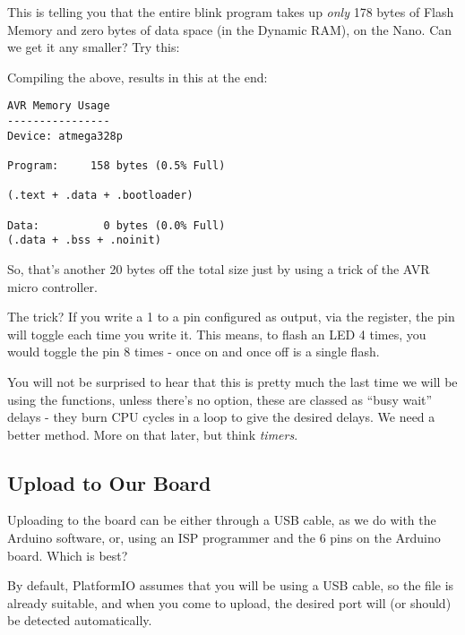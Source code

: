 This is telling you that the entire blink program takes up \emph{only}
178 bytes of Flash Memory and zero bytes of data space (in the Dynamic
RAM), on the Nano.  Can we get it any smaller? Try this:




Compiling the above, results in this at the end:

\begin{lstlisting}[firstnumber=14]
AVR Memory Usage
----------------
Device: atmega328p

Program:     158 bytes (0.5% Full)

(.text + .data + .bootloader)

Data:          0 bytes (0.0% Full)
(.data + .bss + .noinit)
\end{lstlisting}

So, that's another 20 bytes off the total size just by using a trick of the AVR micro controller.

The trick? If you write a 1 to a pin configured as output, via the  register, the pin will toggle each time you write it. This means, to flash an LED 4 times, you would toggle the pin 8 times - once on and once off is a single flash.

\begin{note}
	You will not be surprised to hear that this is pretty much the last time we will be using the  functions, unless there's no option, these are classed as ``busy wait'' delays - they burn CPU cycles in a loop to give the desired delays. We need a better method. More on that later, but think \emph{timers}.
\end{note}

\subsection{Upload to Our Board}\label{upload-to-our-board}

Uploading to the board can be either through a USB cable, as we do with the Arduino software, or, using an ISP programmer and the 6 pins on the Arduino board. Which is best?

By default, PlatformIO assumes that you will be using a USB cable, so the file  is already suitable, and when you come to upload, the desired port will (or should) be detected automatically.

